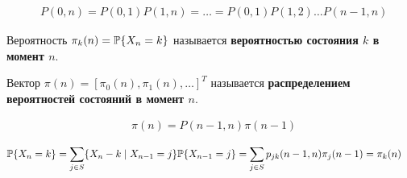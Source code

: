 \begin{corollary}
     \begin{align*}
      & P(0,n) = P(0,1)P(1,n) = \dots = P(0,1)P(1,2)\dots P(n-1,n)
    \end{align*}  
\end{corollary}
\begin{Def}
    Вероятность $\pi_k(n) = \mathbb{P}\{X_n = k\}$ называется \textbf{вероятностью
      состояния $k$ в момент $n$}.
\end{Def}
\begin{Def}
    Вектор $\pi(n) = \left[ \pi_0(n), \pi_1(n), \dots \right]^T$ называется
    \textbf{распределением вероятностей состояний в момент $n$}.
\end{Def}
\begin{theorem}
    \begin{align*}
      & \pi(n) = P(n-1,n)\pi(n-1)
    \end{align*}
\end{theorem}
\begin{Proof}
    \begin{align*}
      & \mathbb{P}\{X_n=k\} = \sum_{j \in S}\{X_n-k \mid X_{n-1}=j\}\mathbb{P}\{X_{n-1}=j\} = \sum_{j \in S}p_{jk}(n-1,n)\pi_{j}(n-1) = \pi_k(n)
    \end{align*}
\end{Proof}
